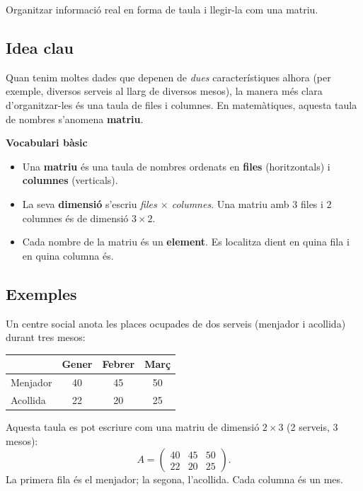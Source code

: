 %
{Organitzar informació real en forma de taula i llegir-la com una matriu.}

\subsection{Idea clau}

Quan tenim moltes dades que depenen de \emph{dues} característiques alhora
(per exemple, diversos serveis al llarg de diversos mesos), la manera més clara
d'organitzar-les és una taula de files i columnes. En matemàtiques, aquesta taula
de nombres s'anomena \textbf{matriu}.

\begin{idea}
\textbf{Vocabulari bàsic}
\begin{itemize}[leftmargin=1.4em, itemsep=2pt]
  \item Una \textbf{matriu} és una taula de nombres ordenats en \textbf{files}
        (horitzontals) i \textbf{columnes} (verticals).
  \item La seva \textbf{dimensió} s'escriu \emph{files $\times$ columnes}.
        Una matriu amb $3$ files i $2$ columnes és de dimensió $3\times 2$.
  \item Cada nombre de la matriu és un \textbf{element}. Es localitza dient
        en quina fila i en quina columna és.
\end{itemize}
\end{idea}

\subsection{Exemples}

\begin{exemple}
Un centre social anota les places ocupades de dos serveis (menjador i acollida)
durant tres mesos:

\begin{center}
\begin{tabular}{lccc}
\toprule
 & Gener & Febrer & Març \\
\midrule
Menjador & 40 & 45 & 50 \\
Acollida & 22 & 20 & 25 \\
\bottomrule
\end{tabular}
\end{center}

Aquesta taula es pot escriure com una matriu de dimensió $2\times 3$
(2 serveis, 3 mesos):
\[
A=\begin{pmatrix} 40 & 45 & 50 \\ 22 & 20 & 25 \end{pmatrix}.
\]
La primera fila és el menjador; la segona, l'acollida. Cada columna és un mes.
\end{exemple}

